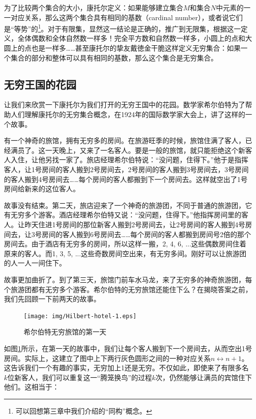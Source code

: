 \documentclass{article}
\begin{document}
为了比较两个集合的大小，康托尔定义：如果能够建立集合$M$和集合$N$中元素的一一对应关系，那么这两个集合具有相同的基数（cardinal number），或者说它们是“等势”的\footnote{可以回想第三章中我们介绍的“同构”概念。}。对于有限集，显然这一结论是正确的，推广到无限集，根据这一定义，全体偶数和全体自然数一样多！完全平方数和自然数一样多，小圆上的点和大圆上的点也是一样多……甚至康托尔的挚友戴徳金干脆这样定义无穷集合：如果一个集合的部分和整体可以具有相同的基数，那么这个集合是无穷集合。


\subsection{无穷王国的花园}

让我们来欣赏一下康托尔为我们打开的无穷王国中的花园。数学家希尔伯特为了帮助人们理解康托尔的无穷集合概念，在1924年的国际数学家大会上，讲了这样的一个故事。

有一个神奇的旅馆，拥有无穷多的房间。在旅游旺季的时候，旅馆住满了客人，已经满员了。这一天晚上，又来了一名客人。要是一般的旅馆，就只能拒绝这个新客人入住，让他另找一家了。旅店经理希尔伯特说：“没问题，住得下。”他于是指挥客人，让1号房间的客人搬到2号房间去，2号房间的客人搬到3号房间去，3号房间的客人搬到4号房间去……每个房间的客人都搬到下一个房间去。这样就空出了1号房间给新来的这位客人。

故事没有结束。第二天，旅店迎来了一个神奇的旅游团，不同于普通的旅游团，它有无穷多个游客。酒店经理希尔伯特又说：“没问题，住得下。”他指挥房间里的客人。让昨天住进1号房间的那位新客人搬到2号房间去，让2号房间的客人搬到4号房间去，让3号房间的客人搬到6号房间去……每个房间的客人都搬到房间号2倍的那个房间去。由于酒店有无穷多的房间，所以这样一搬，2, 4, 6, ...这些偶数房间住着原来的客人。而1, 3, 5, ...这些奇数房间空出来，有无穷多间。刚好可以让旅游团的人一人一间住下。

故事更加曲折了。到了第三天，旅馆门前车水马龙，来了无穷多的神奇旅游团，每个旅游团都有无穷多个游客。希尔伯特的无穷旅馆还能住下么？在揭晓答案之前，我们先回顾一下前两天的故事。

\begin{figure}[htbp]
 \centering
 \texttt{[image: img/Hilbert-hotel-1.eps]}
 \caption{希尔伯特无穷旅馆的第一天}
 \label{fig:Hilbert-hotel-1}
\end{figure}

如图\ref{fig:Hilbert-hotel-1}所示，在第一天的故事中，我们让每个客人搬到下一个房间去，从而空出1号房间。实际上，这建立了图中上下两行灰色圆形之间的一种对应关系$n \leftrightarrow n+1$。这告诉我们一个有趣的事实，无穷加上1还是无穷。不仅如此，即使来了有限多名$k$位新客人，我们可以重复这一“腾笼换鸟”的过程$k$次，仍然能够让满员的宾馆住下他们。这相当于：
\end{document}
